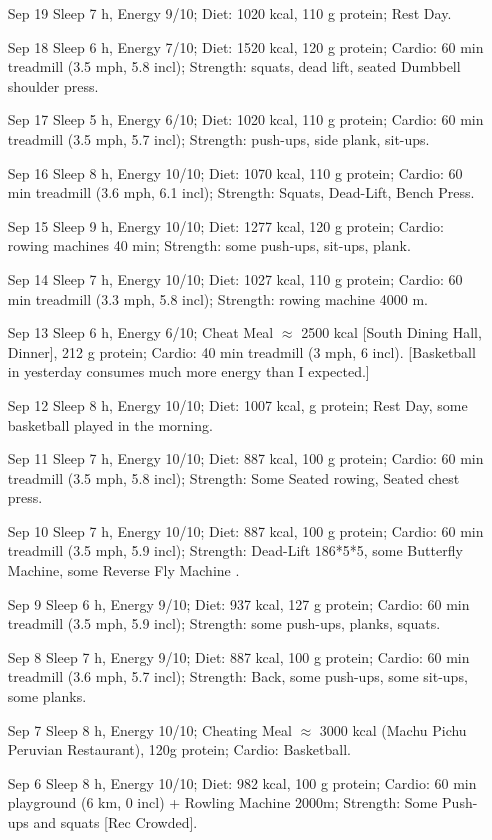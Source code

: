 \documentclass{article}
\begin{document}
\begin{itemize}
\item [Sep 19] Sleep 7 h, Energy 9/10; Diet: 1020 kcal, 110 g protein; Rest Day.
\item [Sep 18] Sleep 6 h, Energy 7/10; Diet: 1520 kcal, 120 g protein; Cardio: 60 min treadmill (3.5 mph, 5.8 incl); Strength: squats, dead lift, seated Dumbbell shoulder press.
\item [Sep 17] Sleep 5 h, Energy 6/10; Diet: 1020 kcal, 110 g protein; Cardio: 60 min treadmill (3.5 mph, 5.7 incl); Strength: push-ups, side plank, sit-ups.
\item [Sep 16] Sleep 8 h, Energy 10/10; Diet:  1070 kcal, 110 g protein; Cardio: 60 min treadmill (3.6 mph, 6.1 incl); Strength: Squats, Dead-Lift, Bench Press.
\item [Sep 15] Sleep 9 h, Energy 10/10; Diet:  1277 kcal, 120 g protein; Cardio: rowing machines 40 min; Strength: some push-ups, sit-ups, plank.
\item [Sep 14] Sleep 7 h, Energy 10/10; Diet: 1027 kcal, 110 g protein; Cardio: 60 min treadmill (3.3 mph, 5.8 incl); Strength: rowing machine 4000 m.
\item [Sep 13] Sleep 6 h, Energy 6/10; Cheat Meal $\approx$ 2500 kcal [South Dining Hall, Dinner], 212 g protein; Cardio: 40 min treadmill (3 mph, 6 incl). [Basketball in yesterday consumes much more energy than I expected.]
\item [Sep 12] Sleep 8 h, Energy 10/10; Diet: 1007 kcal, g protein; Rest Day, some basketball played in the morning.
\item [Sep 11] Sleep 7 h, Energy 10/10; Diet:  887 kcal, 100 g protein; Cardio: 60 min treadmill (3.5 mph, 5.8  incl); Strength: Some Seated rowing, Seated chest press.
\item [Sep 10] Sleep 7 h, Energy 10/10; Diet: 887 kcal, 100 g protein; Cardio: 60 min treadmill (3.5 mph, 5.9 incl); Strength: Dead-Lift 186*5*5, some Butterfly Machine, some Reverse Fly Machine  .
\item [Sep 9] Sleep 6 h, Energy 9/10; Diet: 937 kcal, 127 g protein; Cardio: 60 min treadmill (3.5 mph, 5.9 incl); Strength: some push-ups, planks, squats.
\item [Sep 8] Sleep 7 h, Energy 9/10; Diet: 887 kcal, 100 g protein; Cardio: 60 min treadmill (3.6 mph, 5.7 incl); Strength: Back, some push-ups, some sit-ups, some planks.
\item [Sep 7] Sleep 8 h, Energy 10/10; Cheating Meal $\approx$ 3000 kcal (Machu Pichu Peruvian Restaurant), 120g protein; Cardio: Basketball.
\item [Sep 6] Sleep 8 h, Energy 10/10; Diet:  982 kcal, 100 g protein; Cardio: 60 min playground (6 km, 0 incl) + Rowling Machine 2000m; Strength: Some Push-ups and squats [Rec Crowded].

\end{itemize}
\end{document}
